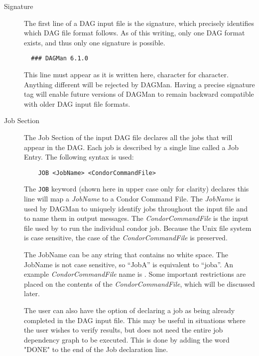 \begin{description}

\item[Signature]

The first line of a DAG input file is the signature, which precisely
identifies which DAG file format follows.  As of this writing, only one DAG
format exists, and thus only one signature is possible.

\begin{verbatim}
  ### DAGMan 6.1.0
\end{verbatim}

This line must appear as it is written here, character for character.
Anything different will be rejected by DAGMan.  Having a precise signature tag
will enable future versions of DAGMan to remain backward compatible with older
DAG input file formats.

\item[Job Section]

The Job Section of the input DAG file declares all the jobs that will appear
in the DAG.  Each job is described by a single line called a Job Entry.  The
following syntax is used:

\begin{verbatim}
	JOB <JobName> <CondorCommandFile>
\end{verbatim}

The \texttt{JOB} keyword (shown here in upper case only for clarity) declares
this line will map a \textit{JobName} to a Condor Command File.  The
\textit{JobName} is used by DAGMan to uniquely identify jobs throughout the
input file and to name them in output messages.  The
\textit{CondorCommandFile} is the input file used by  to run
the individual condor job.  Because the Unix file system is case sensitive,
the case of the \textit{CondorCommandFile} is preserved.

The JobName can be any string that contains no white space.  The JobName is
not case sensitive, so ``JobA'' is equivalent to ``joba''.  An example
\textit{CondorCommandFile} name is .  Some important
restrictions are placed on the contents of the \textit{CondorCommandFile},
which will be discussed later.

The user can also have the option of declaring a job as being already
completed in the DAG input file. This may be useful in situations where the
user wishes to verify results, but does not need the entire job dependency
graph to be executed. This is done by adding the word "DONE" to the end of the
Job declaration line.


\end{description}
